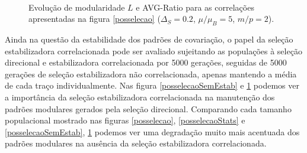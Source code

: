 \begin{center}
\begin{figure}[htbp]
  \vspace{-18pt}
  \vspace{11pt}
  \\
  \caption{Evolução de modularidade $L$ e AVG-Ratio para as correlações
     apresentadas na figura \ref{posselecao} ($\Delta_S = 0.2$, $\mu/\mu_B=5$, $m/p=2$).}
  \label{posselecaoSemEstabStats}
\end{figure}
\end{center}

Ainda na questão da estabilidade dos padrões de covariação, o papel da
seleção estabilizadora correlacionada pode ser avaliado sujeitando as
populações à seleção direcional e estabilizadora correlacionada por 5000
gerações, seguidas de 5000 gerações de seleção estabilizadora não
correlacionada, apenas mantendo a média de cada traço individualmente.
Nas figura \ref{posselecaoSemEstab} e \ref{posselecaoSemEstabStats}
podemos ver a importância da seleção estabilizadora correlacionada na
manutenção dos padrões modulares gerados pela seleção direcional. 
Comparando cada tamanho populacional mostrado nas figuras
\ref{posselecao}, \ref{posselecaoStats} e \ref{posselecaoSemEstab},
\ref{posselecaoSemEstabStats} podemos ver uma degradação muito mais
acentuada dos padrões modulares na ausência da seleção
estabilizadora correlacionada. 

